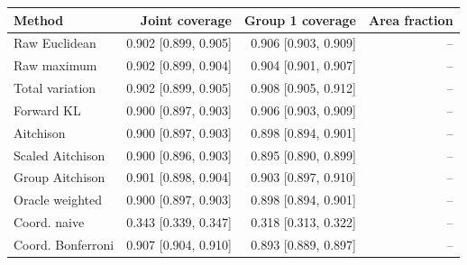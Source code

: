 \begin{tabular}{lrrr}
\toprule
Method & Joint coverage & Group 1 coverage & Area fraction \\
\midrule
Raw Euclidean & 0.902 [0.899, 0.905] & 0.906 [0.903, 0.909] & -- \\
Raw maximum & 0.902 [0.899, 0.904] & 0.904 [0.901, 0.907] & -- \\
Total variation & 0.902 [0.899, 0.905] & 0.908 [0.905, 0.912] & -- \\
Forward KL & 0.900 [0.897, 0.903] & 0.906 [0.903, 0.909] & -- \\
Aitchison & 0.900 [0.897, 0.903] & 0.898 [0.894, 0.901] & -- \\
Scaled Aitchison & 0.900 [0.896, 0.903] & 0.895 [0.890, 0.899] & -- \\
Group Aitchison & 0.901 [0.898, 0.904] & 0.903 [0.897, 0.910] & -- \\
Oracle weighted & 0.900 [0.897, 0.903] & 0.898 [0.894, 0.901] & -- \\
Coord. naive & 0.343 [0.339, 0.347] & 0.318 [0.313, 0.322] & -- \\
Coord. Bonferroni & 0.907 [0.904, 0.910] & 0.893 [0.889, 0.897] & -- \\
\bottomrule
\end{tabular}
